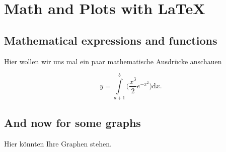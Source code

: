 \documentclass[pflichtenheft.tex]{subfiles}
\begin{document}
\chapter{Math and Plots with \LaTeX}

\section{Mathematical expressions and functions}

Hier wollen wir uns mal ein paar mathematische Ausdrücke anschauen
\newline

\begin{equation}
y = \int\limits_{a+1}^{b} \bigg( \frac{x^3}{2} e^{-x^2} \bigg)\mathrm{d}x.
\end{equation}

\section{And now for some graphs}

Hier könnten Ihre Graphen stehen.

\newline
\end{document}
